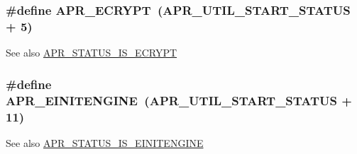 \subsubsection[{\texorpdfstring{A\+P\+R\+\_\+\+E\+C\+R\+Y\+PT}{APR_ECRYPT}}]{\setlength{\rightskip}{0pt plus 5cm}\#define A\+P\+R\+\_\+\+E\+C\+R\+Y\+PT~({\bf A\+P\+R\+\_\+\+U\+T\+I\+L\+\_\+\+S\+T\+A\+R\+T\+\_\+\+S\+T\+A\+T\+US} + 5)}\hypertarget{group__APR__Util__Error_ga2e98ff79515dfd5a21583d09c300d9bb}{}\label{group__APR__Util__Error_ga2e98ff79515dfd5a21583d09c300d9bb}
\begin{DoxySeeAlso}{See also}
\hyperlink{group__APR__Util__Error_ga9933a7168395bc0786b3ba477566fd7b}{A\+P\+R\+\_\+\+S\+T\+A\+T\+U\+S\+\_\+\+I\+S\+\_\+\+E\+C\+R\+Y\+PT} 
\end{DoxySeeAlso}
\subsubsection[{\texorpdfstring{A\+P\+R\+\_\+\+E\+I\+N\+I\+T\+E\+N\+G\+I\+NE}{APR_EINITENGINE}}]{\setlength{\rightskip}{0pt plus 5cm}\#define A\+P\+R\+\_\+\+E\+I\+N\+I\+T\+E\+N\+G\+I\+NE~({\bf A\+P\+R\+\_\+\+U\+T\+I\+L\+\_\+\+S\+T\+A\+R\+T\+\_\+\+S\+T\+A\+T\+US} + 11)}\hypertarget{group__APR__Util__Error_ga9d8482ae4b93bdce0f31f120c0511550}{}\label{group__APR__Util__Error_ga9d8482ae4b93bdce0f31f120c0511550}
\begin{DoxySeeAlso}{See also}
\hyperlink{group__APR__Util__Error_ga0330ff3219d56b41f702364de38d2a18}{A\+P\+R\+\_\+\+S\+T\+A\+T\+U\+S\+\_\+\+I\+S\+\_\+\+E\+I\+N\+I\+T\+E\+N\+G\+I\+NE} 
\end{DoxySeeAlso}

